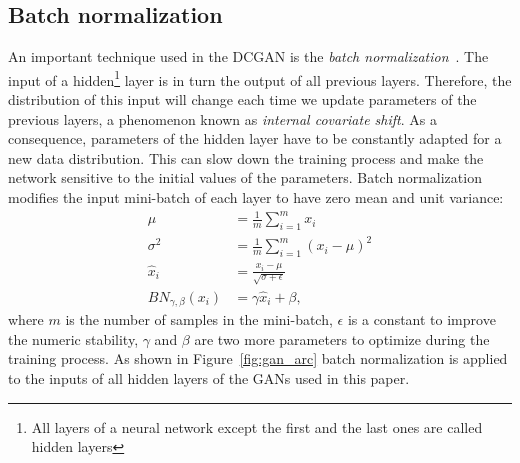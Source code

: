 \subsection{Batch normalization} \label{sec:batch_norm}
An important technique used in the DCGAN is the \textit{batch normalization}~\cite{batch_norm}. The input of a hidden\footnote{All layers of a neural network except the first and the last ones are called hidden layers} layer is in turn the output of all previous layers. Therefore, the distribution of this input will change each time we update parameters of the previous layers, a phenomenon known as \textit{internal covariate shift}. As a consequence, parameters of the hidden layer have to be constantly adapted for a new data distribution. This can slow down the training process and make the network sensitive to the initial values of the parameters. Batch normalization modifies the input mini-batch of each layer to have zero mean and unit variance: 
\begin{align*}
	\mu &= \frac{1}{m} \sum_{i=1}^{m}x_i \\
	\sigma^2 &= \frac{1}{m} \sum_{i=1}^{m}(x_i - \mu)^2 \\
	\hat{x}_i &= \frac{x_i - \mu}{\sqrt{\sigma+\epsilon}} \\
	BN_{\gamma, \beta}(x_i) &= \gamma \hat{x}_i + \beta,
\end{align*}
where $m$ is the number of samples in the mini-batch, $\epsilon$ is a constant to improve the numeric stability, $\gamma$ and $\beta$ are two more parameters to optimize during the training process. As shown in Figure~\ref{fig:gan_arc} batch normalization is applied to the inputs of all hidden layers of the GANs used in this paper.
